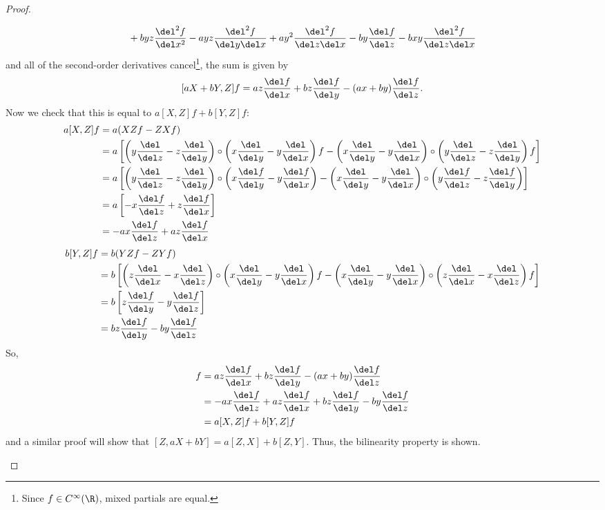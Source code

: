 \documentclass[12pt,letterpaper]{article}
\begin{document}
\begin{enumerate}
\begin{proof}
\begin{enumerate}
\begin{align*}
 	  &\quad + byz\frac{\del^2f}{\del x^2}-ayz\frac{\del^2f}{\del y\del x}+ay^2\frac{\del^2f}{\del z\del x}-by\frac{\del f}{\del z}-bxy\frac{\del^2f}{\del z\del x}
	\end{align*}
	and all of the second-order derivatives cancel\footnote{Since $f\in C^\infty(\R)$, mixed partials are equal.}, the sum is given by
	\[[aX+bY,Z]f = az\frac{\del f}{\del x}+bz\frac{\del f }{\del y}-(ax+by)\frac{\del f}{\del z}.\]
	Now we check that this is equal to $a[X,Z]f+b[Y,Z]f:$
	\begin{align*}
	a[X,Z]f &= a(XZf-ZXf) \\
	&= a\left[\left(y\frac{\del}{\del z}-z\frac{\del}{\del y}\right)\circ\left(x\frac{\del}{\del y}-y\frac{\del}{\del x}\right)f-\left(x\frac{\del}{\del y}-y\frac{\del}{\del x}\right)\circ \left(y\frac{\del}{\del z}-z\frac{\del}{\del y}\right)f\right]\\
  &= a\left[\left(y\frac{\del}{\del z}-z\frac{\del}{\del y}\right)\circ\left(x\frac{\del f}{\del y}-y\frac{\del f}{\del x}\right)
  -\left(x\frac{\del}{\del y}-y\frac{\del}{\del x}\right)\circ \left(y\frac{\del f}{\del z}-z\frac{\del f}{\del y}\right)\right]\\
  &=a\left[-x\frac{\del f}{\del z}+z\frac{\del f}{\del x}\right] \\
    &=-ax\frac{\del f}{\del z}+az\frac{\del f}{\del x}
\end{align*}
\begin{align*}
  b[Y,Z]f&=b(YZf-ZYf)\\
  &=b\left[\left(z\frac{\del}{\del x}-x\frac{\del}{\del z} \right) \circ \left(x\frac{\del}{\del y}-y\frac{\del}{\del x}\right)f
  -\left(x\frac{\del}{\del y}-y\frac{\del}{\del x}\right) \circ \left(z\frac{\del}{\del x}-x\frac{\del}{\del z} \right)f\right] \\
	&= b\left[z\frac{\del f}{\del y}-y\frac{\del f}{\del z}\right] \\
	&= bz\frac{\del f}{\del y}-by\frac{\del f}{\del z} 
	\end{align*}
	So, 
	\begin{align*}
	[aX+bY,Z]f &= az\frac{\del f}{\del x}+bz\frac{\del f }{\del y}-(ax+by)\frac{\del f}{\del z}\\
	&=-ax\frac{\del f}{\del z}+az\frac{\del f}{\del x} + bz\frac{\del f}{\del y}-by\frac{\del f}{\del z} \\
	&= a[X,Z]f + b[Y,Z]f
	\end{align*}
and	a similar proof will show that $[Z,aX+bY]=a[Z,X]+b[Z,Y]$. Thus, the bilinearity property is shown. 
	

\end{enumerate}
\end{proof}
\end{enumerate}
\end{document}
